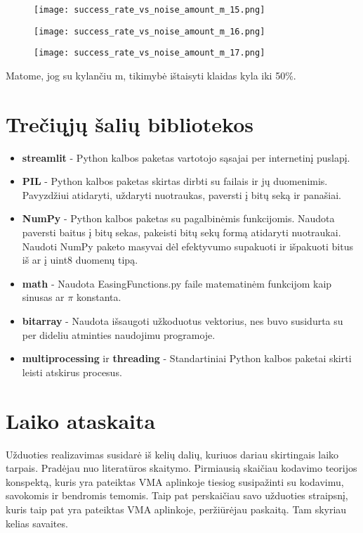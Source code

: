 \documentclass{article}
\begin{document}
\begin{figure}[H]
    \centering
    \begin{minipage}{0.45\textwidth}
        \centering
        \texttt{[image: success\_rate\_vs\_noise\_amount\_m\_15.png]}
    \end{minipage}
    \hfill
    \begin{minipage}{0.45\textwidth}
        \centering
        \texttt{[image: success\_rate\_vs\_noise\_amount\_m\_16.png]}
    \end{minipage}
\end{figure}
\begin{figure}[H]
    \centering
    \texttt{[image: success\_rate\_vs\_noise\_amount\_m\_17.png]}
\end{figure}
Matome, jog su kylančiu m, tikimybė ištaisyti klaidas kyla iki 50\%.


\section{Trečiųjų šalių bibliotekos}
\begin{itemize}
    \item \textbf{streamlit} - Python kalbos paketas vartotojo sąsajai per internetinį puslapį.
    \item \textbf{PIL} - Python kalbos paketas skirtas dirbti su failais ir jų duomenimis. Pavyzdžiui atidaryti, uždaryti nuotraukas, paversti į bitų seką ir panašiai.
    \item \textbf{NumPy} - Python kalbos paketas su pagalbinėmis funkcijomis. Naudota paversti baitus į bitų sekas, pakeisti bitų sekų formą atidaryti nuotraukai. Naudoti NumPy paketo masyvai dėl efektyvumo supakuoti ir išpakuoti bitus iš ar į uint8 duomenų tipą.
    \item \textbf{math} - Naudota EasingFunctions.py faile matematinėm funkcijom kaip sinusas ar $\pi$ konstanta.
    \item \textbf{bitarray} - Naudota išsaugoti užkoduotus vektorius, nes buvo susidurta su per dideliu atminties naudojimu programoje.
    \item \textbf{multiprocessing} ir \textbf{threading} - Standartiniai Python kalbos paketai skirti leisti atskirus procesus.
\end{itemize}



\section{Laiko ataskaita}
Užduoties realizavimas susidarė iš kelių dalių, kuriuos dariau skirtingais laiko tarpais. Pradėjau nuo literatūros skaitymo. Pirmiausią skaičiau kodavimo teorijos konspektą, kuris yra pateiktas VMA aplinkoje tiesiog susipažinti su kodavimu, savokomis ir bendromis temomis. Taip pat perskaičiau savo užduoties straipsnį, kuris taip pat yra pateiktas VMA aplinkoje, peržiūrėjau paskaitą. Tam skyriau kelias savaites.
\end{document}
